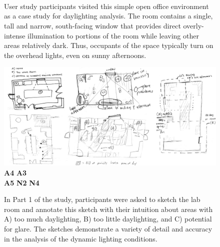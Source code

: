 \documentclass[review]{vgtc}                 %
\begin{document}
\begin{figure}[t]
\begin{minipage}{1.65in}~{\color{white}{\em camera A, lights on}}\end{minipage}
\begin{minipage}{1.65in}~{\color{white}{\em camera B, lights on}}\end{minipage}\vspace{0.00in}\\
\caption{User study participants visited this simple open office
  environment as a case study for daylighting analysis.  The room
  contains a single, tall and narrow, south-facing window that
  provides direct overly-intense illumination to portions of the room
  while leaving other areas relatively dark.  Thus, occupants of the
  space typically turn on the overhead lights, even on sunny
  afternoons.
}
\label{figure:example_room}
\end{figure}


\begin{figure}[t]
%
\includegraphics[width=7.0in]{images/sketches/all_together}%
%
\vspace{-2.7in}
{\bf A4} \hspace{1.9in}
{\bf A3}
\vspace{2.3in}
\\
{\bf A5} \hspace{1.8in}
{\bf N2} \hspace{3in}
{\bf N4}
\vspace{-0.1in}\\
%
\caption{In Part 1 of the study, participants were asked to sketch the
  lab room and annotate this sketch with their intuition about areas
  with A) too much daylighting, B) too little daylighting, and C)
  potential for glare.  The sketches demonstrate a variety of detail
  and accuracy in the analysis of the dynamic lighting conditions. }
\label{figure:sketches}
\end{figure}
\end{document}

